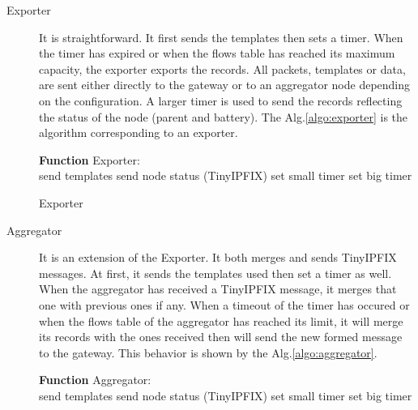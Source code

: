 \begin{description}
  \item[Exporter] It is straightforward. It first sends the templates then sets a timer. When the timer has expired or when the flows table has reached its maximum capacity, the exporter exports the records. All packets, templates or data, are sent either directly to the gateway or to an aggregator node depending on the configuration. A larger timer is used to send the records reflecting the status of the node (parent and battery). The Alg.\ref{algo:exporter} is the algorithm corresponding to an exporter.

  \begin{algorithm}
    \textbf{Function} Exporter:\\
    send templates\;
		send node status (TinyIPFIX)\;
    set small timer\;
		set big timer\;
   \caption{Exporter}
   \label{algo:exporter}
  \end{algorithm}

  \item[Aggregator] It is an extension of the Exporter. It both merges and sends TinyIPFIX messages. At first, it sends the templates used then set a timer as well. When the aggregator has received a TinyIPFIX message, it merges that one with previous ones if any. When a timeout of the timer has occured or when the flows table of the aggregator has reached its limit, it will merge its records with the ones received then will send the new formed message to the gateway. This behavior is shown by the Alg.\ref{algo:aggregator}.

  \begin{algorithm}
    \textbf{Function} Aggregator:\\
    send templates\;
		send node status (TinyIPFIX)\;
    set small timer\;
		set big timer\;
\end{algorithm}
\end{description}
